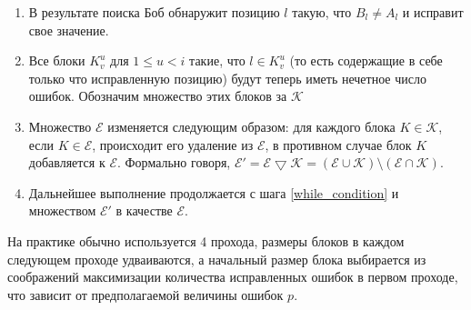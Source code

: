 \begin{enumerate}
  \item В результате поиска Боб обнаружит позицию $l$ такую, что $B_l \neq A_l$ и исправит свое значение. 
  
  \item Все блоки $K^u_v$ для $1 \leq u < i$ такие, что $l \in K^u_v$ (то есть содержащие в себе только что исправленную позицию) будут теперь иметь нечетное число ошибок. Обозначим множество этих блоков за $\mathcal{K}$
  
  \item Множество $\mathcal{E}$ изменяется следующим образом: для каждого блока $K \in \mathcal{K}$, если $K \in \mathcal{E}$, происходит его удаление из $\mathcal{E}$, в противном случае блок $K$ добавляется к $\mathcal{E}$. Формально говоря, $\mathcal{E}' = \mathcal{E} \bigtriangledown \mathcal{K} = (\mathcal{E} \cup \mathcal{K}) \setminus (\mathcal{E} \cap \mathcal{K})$.
  
  \item Дальнейшее выполнение продолжается с шага \ref{while_condition} и множеством $\mathcal{E}'$ в качестве $\mathcal{E}$.

\end{enumerate}
На практике обычно используется 4 прохода, размеры блоков в каждом следующем проходе удваиваются, а начальный размер блока выбирается из соображений максимизации количества исправленных ошибок в первом проходе, что зависит от предполагаемой величины ошибок $p$.

